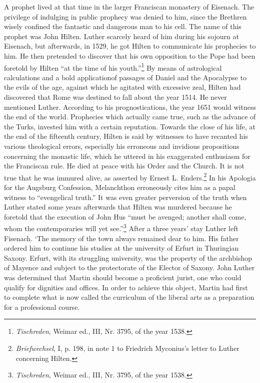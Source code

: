 A prophet lived at that time in the larger Franciscan monastery of
Eisenach. The privilege of indulging in public prophecy was denied
to him, since the Brethren wisely confined the fantastic and dangerous
man to his cell. The name of this prophet was John Hilten. Luther
scarcely heard of him during his sojourn at Eisenach, but afterwards,
in 1529, he got Hilten to communicate his prophecies to him. He
then pretended to discover that his own opposition to the Pope had
been foretold by Hilten “at the time of his youth.”\footnote{\textit{Tischreden}, Weimar ed., III, Nr. 3795, of the year 1538.}
By means of
astrological calculations and a bold applicationof passages of Daniel
and the Apocalypse to the evils of the age, against which he agitated
with excessive zeal, Hilten had discovered that Rome was destined to
fall about the year 1514. He never mentioned Luther. According to
his prognostications, the year 1651 would witness the end of the
world. Prophecies which actually came true, such as the advance of
the Turks, invested him with a certain reputation. Towards the close
of his life, at the end of the fifteenth century, Hilten is said by witnesses to have recanted his various theological errors, especially his
erroneous and invidious propositions concerning the monastic life,
which he uttered in his exaggerated enthusiasm for the Franciscan
rule. He died at peace with his Order and the Church. It is not true
that he was immured alive, as asserted by Ernest L. Enders.\footnote{\textit{Briefwechsel}, I, p. 198, in note 1 to Friedrich Myconius’s letter to Luther concerning Hilten.}
In his
Apologia for the Augsburg Confession, Melanchthon erroneously
cites him as a papal witness to “evengelical truth.” It was even greater
perversion of the truth when Luther stated some years afterwards
that Hilten was murdered because he foretold that the execution of
John Hus “must be avenged; another shall come, whom the contemporaries will yet see.”\footnote{\textit{Tischreden}, Weimar ed., III, Nr. 3795, of the year 1538.}
After a three years’ stay Luther left Fisenach. ‘The memory of the
town always remained dear to him. His father ordered him to continue his studies at the university of Erfurt in Thuringian Saxony.
Erfurt, with its struggling university, was the property of the archbishop
of Mayence and subject to the protectorate of the Elector of
Saxony. John Luther was determined that Martin should become a
proficient jurist, one who could qualify for dignities and offices. In
order to achieve this object, Martin had first to complete what is now
called the curriculum of the liberal arts as a preparation for a professional course.

